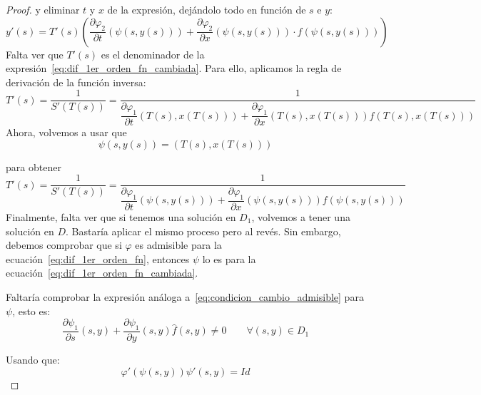 \begin{teo}
\begin{proof}
    y eliminar $t$ y $x$ de la expresión, dejándolo todo en función de $s$ e $y$:
    \begin{equation*}
        y'(s) = T'(s) \left(\dfrac{\partial\varphi_2}{\partial t}(\psi(s,y(s)))+ \dfrac{\partial \varphi_2}{\partial x}(\psi(s,y(s)))\cdot f(\psi(s,y(s)))\right)
    \end{equation*}
    Falta ver que $T'(s)$ es el denominador de la expresión~\ref{eq:dif_1er_orden_fn_cambiada}. Para ello, aplicamos la regla de derivación de la función inversa:
    \begin{equation*}
        T'(s) = \dfrac{1}{S'(T(s))} =  \dfrac{1}{\dfrac{\partial\varphi_1}{\partial t}(T(s),x(T(s))) + \dfrac{\partial\varphi_1}{\partial x}(T(s),x(T(s)))f(T(s),x(T(s)))} 
    \end{equation*}
    Ahora, volvemos a usar que
    \begin{equation*}
        \psi(s,y(s)) = (T(s), x(T(s)))
    \end{equation*}

    para obtener
    \begin{equation*}
        T'(s) = \dfrac{1}{S'(T(s))} =  \dfrac{1}{\dfrac{\partial\varphi_1}{\partial t}(\psi(s,y(s))) + \dfrac{\partial\varphi_1}{\partial x}(\psi(s,y(s)))f(\psi(s,y(s)))} 
    \end{equation*}
    Finalmente, falta ver que si tenemos una solución en $D_1$, volvemos a tener una solución en $D$. Bastaría aplicar el mismo proceso pero al revés. Sin embargo, debemos comprobar que si $\varphi$ es admisible para la ecuación~\ref{eq:dif_1er_orden_fn}, entonces $\psi$ lo es para la ecuación~\ref{eq:dif_1er_orden_fn_cambiada}.

    Faltaría comprobar la expresión análoga a~\ref{eq:condicion_cambio_admisible} para $\psi$, esto es:
    \begin{equation*}
        \dfrac{\partial\psi_1}{\partial s}(s,y) + \dfrac{\partial\psi_1}{\partial y}(s,y)\hat{f}(s,y) \neq 0 \qquad \forall (s,y) \in  D_1
    \end{equation*}

    Usando que:
    \begin{equation*}
        \varphi'(\psi(s,y))\psi'(s,y) = Id
    \end{equation*}
\end{proof}
\end{teo}~\\

